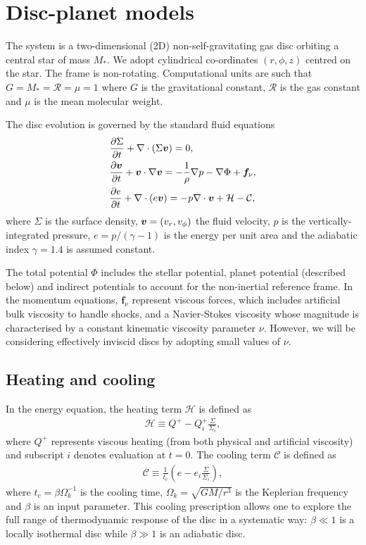 \section{Disc-planet models}\label{model}
The system is a two-dimensional (2D) non-self-gravitating gas disc orbiting
a central star of mass $M_*$. We adopt cylindrical
co-ordinates $(r,\phi,z)$ centred on the star. The frame is   
non-rotating. Computational units are such that 
$G=M_*=\mathcal{R}=\mu=1$ where $G$ is the gravitational constant,
$\mathcal{R}$ is the gas constant and $\mu$ is the mean molecular
weight. 

The disc evolution is governed by the standard fluid equations  
\begin{align}\label{3d_gov_eq}
  &\frac{\p\Sigma}{\p t}+\nabla\cdot(\Sigma \bv)=0, \\
  & \frac{\p\bv}{\p t}+\bv\cdot\nabla\bv= -\frac{1}{\rho}\nabla p 
  - \nabla{\Phi} + \bm{f}_\nu,\\
  & \frac{\p e}{\p t} + \nabla\cdot(e\bv) = -p\nabla\cdot\bv +
  \mathcal{H} - \mathcal{C}, %
\end{align}
where $\Sigma$ is the surface density, $\bm{v} = (v_r,v_\phi)$ the fluid
velocity, $p$ is the vertically-integrated pressure, $e=p/(\gamma-1)$ is the energy
per unit area and the adiabatic index $\gamma=1.4$ is assumed
constant. 

The total potential $\Phi$ includes the stellar potential, planet potential
(described below) 
and indirect potentials to account for the non-inertial reference
frame. 
In the momentum equations, $\bm{f}_\nu$ represent viscous forces, 
which includes artificial bulk viscosity to handle shocks, and a
Navier-Stokes viscosity whose magnitude is  
characterised by a constant kinematic viscosity parameter
$\nu$. However, we will be considering effectively inviscid discs by
adopting small values of $\nu$.  

\subsection{Heating and cooling}
In the energy equation, the heating term $\mathcal{H}$ is defined as 
\begin{align}
  \mathcal{H} \equiv Q^+ - Q^+_i\frac{\Sigma}{\Sigma_i}, 
\end{align}
where $Q^+$ represents viscous heating (from both physical and
  artificial viscosity) and subscript $i$ denotes
evaluation at $t=0$. The cooling term $\mathcal{C}$ is defined as
\begin{align}
  \mathcal{C} \equiv \frac{1}{t_c}\left(e -
  e_i\frac{\Sigma}{\Sigma_i}\right),  
\end{align}
where $t_c = \beta\Omega_k^{-1}$ is the cooling time,
$\Omega_k=\sqrt{GM/r^3}$ is the Keplerian frequency and $\beta$ is an
input parameter. This cooling prescription allows one 
to explore the full range of thermodynamic response of the disc in a 
systematic way: $\beta\ll1$ is a locally isothermal disc while
$\beta\gg1$ is an adiabatic disc.  


